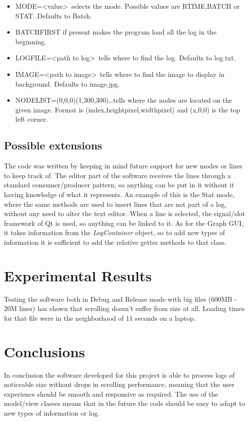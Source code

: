 \begin{itemize}
	\item MODE=\textless value\textgreater \ selects the mode. Possible values are RTIME,BATCH or STAT. Defaults to Batch.
	
	\item BATCHFIRST if present makes the program load all the log in the beginning.
	
	\item LOGFILE=\textless path to log\textgreater \ tells where to find the log. Defaults to log.txt.
	
	\item IMAGE=\textless path to image\textgreater \ tells where to find the image to display in background. Defaults to image.jpg.
	
	\item NODELIST=(0,0,0)(1,300,300)\dots tells where the nodes are located on the given image. Format is (index,heightpixel,widthpixel) and (x,0,0) is the top left corner.
\end{itemize}

\subsection{Possible extensions}
The code was written by keeping in mind future support for new modes or lines to keep track of. The editor part of the software receives the lines through a standard consumer/producer pattern, so anything can be put in it without it having knowledge of what it represents. An example of this is the Stat mode, where the same methods are used to insert lines that are not part of a log, without any need to alter the text editor. When a line is selected, the signal/slot framework of Qt is used, so anything can be linked to it.
As for the Graph GUI, it takes information from the \textit{LogContainer} object, so to add new types of information it is sufficient to add the relative getter methods to that class.

\section{Experimental Results}
Testing the software both in Debug and Release mode with big files (\todo600MB - 20M lines) has shown that scrolling doesn't suffer from size at all. Loading times for that file were in the neighborhood of 11 seconds on a laptop.
\section{Conclusions}
In conclusion the software developed for this project is able to process logs of noticeable size without drops in scrolling performance, meaning that the user experience should be smooth and responsive as required. The use of the model/view classes means that in the future the code should be easy to adapt to new types of information or log.

